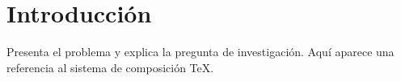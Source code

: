 \section{ Introducción }
Presenta el problema y explica la pregunta de investigación. Aquí aparece una referencia al sistema de composición TeX. \autocite{knuth1984}
